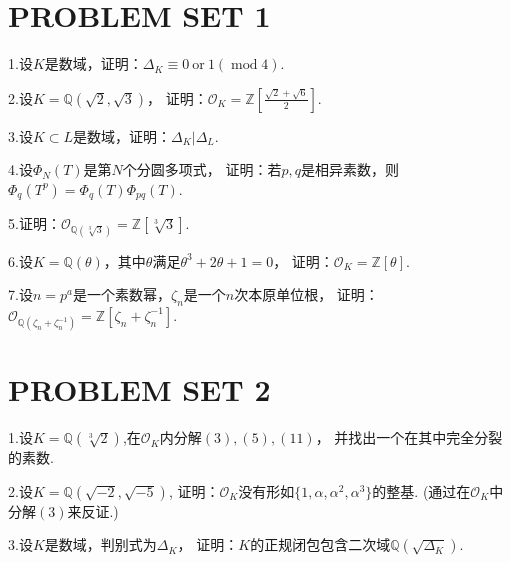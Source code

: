 \renewcommand{\mod}{\operatorname{mod}}

\section{PROBLEM SET 1}

1.设$K$是数域，证明：$\Delta_K\equiv 0\ \mathrm{or}\ 1(\mod 4)$.

2.设$K=\mathbb{Q}(\sqrt{2},\sqrt{3})$，
证明：$\mathcal{O}_K=\mathbb{Z}[\frac{\sqrt{2}+\sqrt{6}}{2}]$.

3.设$K\subset L$是数域，证明：$\Delta_K|\Delta_L$.

4.设$\Phi_N(T)$是第$N$个分圆多项式，
证明：若$p,q$是相异素数，则$\Phi_q(T^p)=\Phi_q(T)\Phi_{pq}(T)$.

5.证明：$\mathcal{O}_{\mathbb{Q}(\sqrt[3]{3})}=\mathbb{Z}[\sqrt[3]{3}]$.

6.设$K=\mathbb{Q}(\theta)$，其中$\theta$满足$\theta^3+2\theta+1=0$，
证明：$\mathcal{O}_K=\mathbb{Z}[\theta]$.

7.设$n=p^a$是一个素数幂，$\zeta_n$是一个$n$次本原单位根，
证明：$\mathcal{O}_{\mathbb{Q}(\zeta_n+\zeta_n^{-1})}=\mathbb{Z}[\zeta_n+\zeta_n^{-1}]$.

\section{PROBLEM SET 2}
1.设$K=\mathbb{Q}(\sqrt[3]{2})$,在$\mathcal{O}_K$内分解$(3),(5),(11)$，
并找出一个在其中完全分裂的素数.

2.设$K=\mathbb{Q}(\sqrt{-2},\sqrt{-5})$,
证明：$\mathcal{O}_K$没有形如$\{1,\alpha,\alpha^2,\alpha^3\}$的整基.
(通过在$\mathcal{O}_K$中分解$(3)$来反证.)

3.设$K$是数域，判别式为$\Delta_K$，
证明：$K$的正规闭包包含二次域$\mathbb{Q}(\sqrt{\Delta_K})$.

